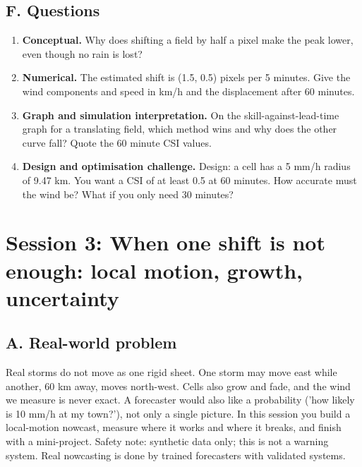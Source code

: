 \documentclass[11pt,a4paper]{article}
\begin{document}
\subsection*{F. Questions}
\begin{enumerate}[nosep]
\item \textbf{Conceptual.} Why does shifting a field by half a pixel make the peak lower, even though no rain is lost?
\item \textbf{Numerical.} The estimated shift is (1.5, 0.5) pixels per 5 minutes. Give the wind components and speed in km/h and the displacement after 60 minutes.
\item \textbf{Graph and simulation interpretation.} On the skill-against-lead-time graph for a translating field, which method wins and why does the other curve fall? Quote the 60 minute CSI values.
\item \textbf{Design and optimisation challenge.} Design: a cell has a 5 mm/h radius of 9.47 km. You want a CSI of at least 0.5 at 60 minutes. How accurate must the wind be? What if you only need 30 minutes?
\end{enumerate}

\section{Session 3: When one shift is not enough: local motion, growth, uncertainty}

\subsection*{A. Real-world problem}
Real storms do not move as one rigid sheet. One storm may move east while another, 60 km away, moves north-west. Cells also grow and fade, and the wind we measure is never exact. A forecaster would also like a probability ('how likely is 10 mm/h at my town?'), not only a single picture. In this session you build a local-motion nowcast, measure where it works and where it breaks, and finish with a mini-project. Safety note: synthetic data only; this is not a warning system. Real nowcasting is done by trained forecasters with validated systems.
\end{document}

